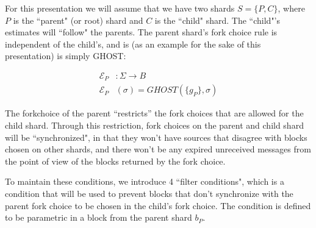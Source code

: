 For this presentation we will assume that we have two shards $S= \{P, C\}$, where $P$ is the ``parent" (or root) shard and $C$ is the ``child" shard. The ``child"'s estimates will ``follow" the parents. The parent shard's fork choice rule is independent of the child's, and is (as an example for the sake of this presentation) is simply GHOST:

\begin{defn}
\begin{align*}
  \mathcal{E}_P&: \Sigma \to B \\
  \mathcal{E}_P&(\sigma) = GHOST(\{g_P\}, \sigma)
\end{align*}
\end{defn}

The forkchoice of the parent ``restricts'' the fork choices that are allowed for the child shard. Through this restriction, fork choices on the parent and child shard will be ``synchronized", in that they won't have sources that disagree with blocks chosen on other shards, and there won't be any expired unreceived messages from the point of view of the blocks returned by the fork choice.

To maintain these conditions, we introduce 4 ``filter conditions", which is a condition that will be used to prevent blocks that don't synchronize with the parent fork choice to be chosen in the child's fork choice. The condition is defined to be parametric in a block from the parent shard $b_P$.

